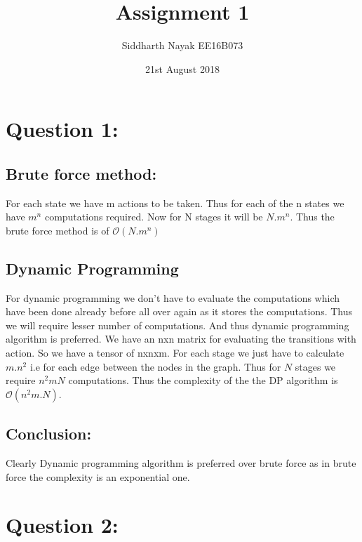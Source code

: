 \documentclass{article}
\title{Assignment 1}
\date{21st August 2018}
\author{Siddharth Nayak EE16B073}
\begin{document}
\maketitle


\section{Question 1:}
\subsection{Brute force method:}
For each state we have m actions to be taken. Thus for each of the n states we have $m^n$ computations required. Now for N stages it will be $N.m^n$.
Thus the brute force method is of  $\mathcal O(N.m^n)$

\subsection{Dynamic Programming}
For dynamic programming we don't have to evaluate the computations which have been done already before all over again as it stores the computations. Thus we will require lesser number 
of computations. And thus dynamic programming algorithm is preferred. We have an nxn matrix for evaluating the transitions with action. So we have a tensor of nxnxm.
For each stage we just have to calculate $m.n^2$ i.e for each edge between the nodes in the graph. Thus for $N$ stages we require $n^2mN$ computations.
Thus the complexity of the the DP algorithm is $\mathcal O(n^2m.N)$.

\subsection{Conclusion:}
Clearly Dynamic programming algorithm is preferred over brute force as in brute force the complexity is an exponential one. 
\section{Question 2:}
\end{document}
